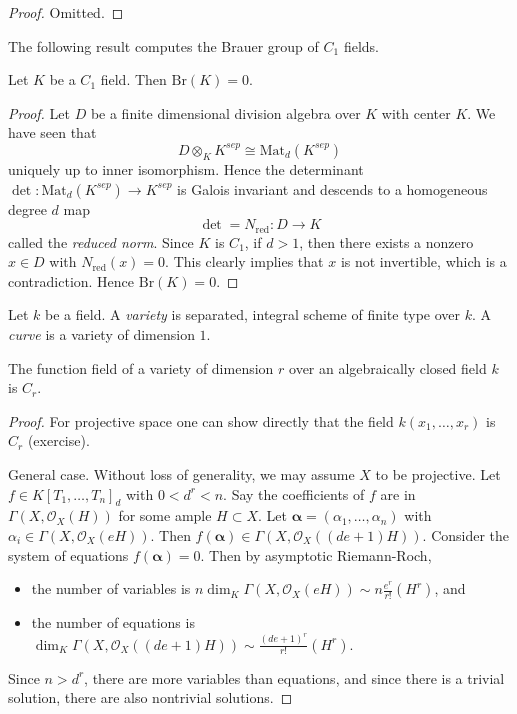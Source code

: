 \begin{proof}
Omitted.
\end{proof}

\noindent
The following result computes the Brauer group of $C_1$ fields.

\begin{theorem}
\label{theorem-C1-brauer-group-zero}
Let $K$ be a $C_1$ field. Then $\text{Br}(K) = 0$.
\end{theorem}

\begin{proof}
Let $D$ be a finite dimensional division algebra over $K$ with center $K$. We
have seen that
$$
D \otimes_K K^{sep} \cong \text{Mat}_d(K^{sep})
$$
uniquely up to inner isomorphism. Hence the determinant $\det :
\text{Mat}_d(K^{sep}) \to K^{sep}$ is Galois invariant and descends to a
homogeneous degree $d$ map
$$
\det = N_\text{red} : D \longrightarrow K
$$
called the {\it reduced norm}. Since $K$ is $C_1$, if $d > 1$, then there
exists a nonzero $x \in D$ with $N_\text{red}(x) = 0$. This clearly implies
that $x$ is not invertible, which is a contradiction. Hence $\text{Br}(K) = 0$.
\end{proof}

\begin{definition}
\label{definition-variety}
Let $k$ be a field. A {\it variety} is separated, integral scheme of
finite type over $k$. A {\it curve} is a variety of dimension $1$.
\end{definition}

\begin{theorem}
\label{theorem-tsen}
The function field of a variety of dimension $r$ over an algebraically closed
field $k$ is $C_r$.
\end{theorem}

\begin{proof}
For projective space one can show directly that the field
$k(x_1, \ldots, x_r)$ is $C_r$ (exercise).

\medskip\noindent
General case. Without loss of generality, we may assume $X$ to be projective.
Let $f \in K[T_1, \ldots, T_n]_d$ with $0 < d^r <n$. Say the coefficients of $f$
are in $\Gamma(X, \mathcal{O}_X(H))$ for some ample $H \subset X$. Let
$\mathbf{\alpha} = (\alpha_1, \ldots, \alpha_n)$ with $\alpha_i \in \Gamma(X,
\mathcal{O}_X(eH))$. Then $f(\mathbf{\alpha}) \in \Gamma(X,
\mathcal{O}_X((de+1)H))$. Consider the system of equations $f(\mathbf{\alpha})
=0$. Then by asymptotic Riemann-Roch,
\begin{itemize}
\item
the number of variables is $n\dim_K \Gamma(X, \mathcal{O}_X(eH)) \sim
n\frac{e^r}{r!} (H^r)$, and
\item
the number of equations is $\dim_K \Gamma(X, \mathcal{O}_X((de+1)H)) \sim
\frac{(de+1)^r}{r!} (H^r).$
\end{itemize}
Since $n> d^r$, there are more variables than equations, and since there is a
trivial solution, there are also nontrivial solutions.
\end{proof}

